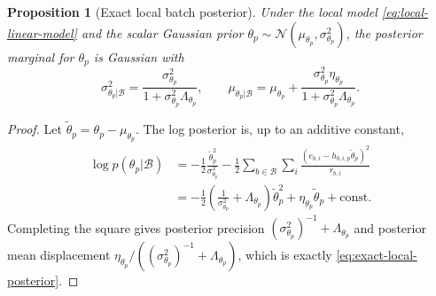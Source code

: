 \documentclass[11pt]{article}
\newtheorem{proposition}{Proposition}
\begin{document}
\begin{proposition}[Exact local batch posterior]
Under the local model \eqref{eq:local-linear-model} and the scalar Gaussian
prior
\(
\theta_p\sim
\mathcal{N}(\mu_{\theta_p},\sigma^2_{\theta_p})
\),
the posterior marginal for
\(
\theta_p
\)
is Gaussian with
\begin{equation}
    \sigma^2_{\theta_p|\mathcal{B}}
    =
    \frac{\sigma^2_{\theta_p}}
    {1+\sigma^2_{\theta_p}\Lambda_{\theta_p}},
    \qquad
    \mu_{\theta_p|\mathcal{B}}
    =
    \mu_{\theta_p}
    +
    \frac{\sigma^2_{\theta_p}\eta_{\theta_p}}
    {1+\sigma^2_{\theta_p}\Lambda_{\theta_p}}.
    \label{eq:exact-local-posterior}
\end{equation}
\end{proposition}

\begin{proof}
Let
\(
\tilde{\theta}_p=\theta_p-\mu_{\theta_p}
\).
The log posterior is, up to an additive constant,
\begin{align}
    \log p(\theta_p|\mathcal{B})
    &=
    -\frac{1}{2}
    \frac{\tilde{\theta}_p^2}{\sigma^2_{\theta_p}}
    -
    \frac{1}{2}
    \sum_{b\in\mathcal{B}}\sum_i
    \frac{(e_{b,i}-h_{b,i,p}\tilde{\theta}_p)^2}{r_{b,i}}  \nonumber \\
    &=
    -\frac{1}{2}
    \left(
    \frac{1}{\sigma^2_{\theta_p}}
    +
    \Lambda_{\theta_p}
    \right)
    \tilde{\theta}_p^2
    +
    \eta_{\theta_p}\tilde{\theta}_p
    + \mathrm{const}.
    \label{eq:posterior-complete-square}
\end{align}
Completing the square gives posterior precision
\(
(\sigma^2_{\theta_p})^{-1}+\Lambda_{\theta_p}
\)
and posterior mean displacement
\(
\eta_{\theta_p}/((\sigma^2_{\theta_p})^{-1}+\Lambda_{\theta_p})
\),
which is exactly \eqref{eq:exact-local-posterior}.
\end{proof}
\end{document}
